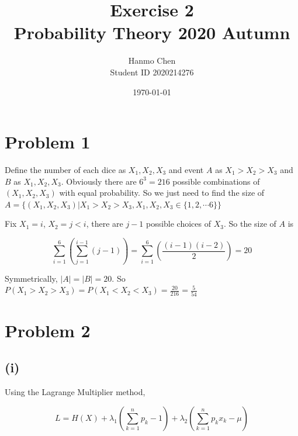 \documentclass{article}
\title{Exercise 2 \\ Probability Theory 2020 Autumn}
\author{Hanmo Chen \\ Student ID 2020214276}
\date{\today}
\begin{document}
\maketitle
\tableofcontents
\newpage
\section{Problem 1}

Define the number of each dice as $X_1,X_2,X_3$ and event $A$ as $X_1>X_2>X_3$ and $B$ as $X_1,X_2,X_3$. Obviously there are $6^3 = 216$ possible combinations of $(X_1,X_2,X_3)$ with equal probability. So we just need to find the size of $A = \{(X_1,X_2,X_3)|X_1>X_2>X_3,X_1,X_2,X_3 \in \{1,2,\cdots 6\}\}$

Fix $X_1 = i$, $X_2 = j <i$, there are $j-1$ possible choices of $X_3$. So the size of $A$ is 

\begin{equation}
    \sum_{i=1}^6 \left(\sum_{j=1}^{i-1} (j-1)\right) = \sum_{i=1}^6 \left(\frac{(i-1)(i-2)}{2}\right) = 20
\end{equation}

Symmetrically, $|A| = |B| = 20$. So $P(X_1 >X_2>X_3)   = P(X_1 < X_2<X_3) = \frac{20}{216} = \frac{5}{54}$


\section{Problem 2}

\subsection{(i)}



Using the Lagrange Multiplier method, 

\begin{equation}
    L = H(X) + \lambda_1(\sum_{k=1}^n p_k - 1) + \lambda_2 (\sum_{k=1}^n p_kx_k - \mu)
\end{equation}
\end{document}
